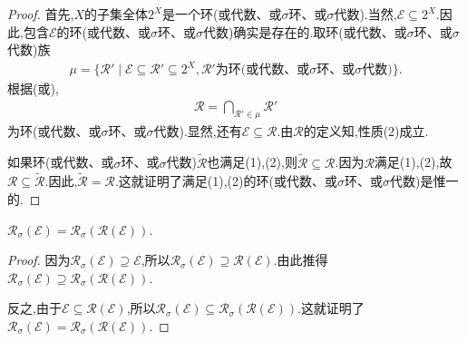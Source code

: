 \documentclass[../../main.tex]{subfiles}%
\begin{document}
\begin{proof}

首先,$X$的子集全体$2^X$是一个环(或代数、或$\sigma$环、或$\sigma$代数).当然,$\mathscr{E} \subseteq 2^X$.因此,包含$\mathscr{E}$的环(或代数、或$\sigma$环、或$\sigma$代数)确实是存在的.取环(或代数、或$\sigma$环、或$\sigma$代数)族
\begin{align*}
\mu = \{\mathscr{R}' \mid \mathscr{E} \subseteq \mathscr{R}' \subseteq 2^X, \mathscr{R}' \text{为环(或代数、或$\sigma$环、或$\sigma$代数)}\}.
\end{align*}
根据(或),
\begin{align*}
\mathscr{R} = \bigcap_{\mathscr{R}' \in \mu} \mathscr{R}'
\end{align*}
为环(或代数、或$\sigma$环、或$\sigma$代数).显然,还有$\mathscr{E} \subseteq \mathscr{R}$.由$\mathscr{R}$的定义知,性质(2)成立.

如果环(或代数、或$\sigma$环、或$\sigma$代数)$\widetilde{\mathscr{R}}$也满足(1),(2),则$\widetilde{\mathscr{R}} \subseteq \mathscr{R}$.因为$\mathscr{R}$满足(1),(2),故$\mathscr{R} \subseteq \widetilde{\mathscr{R}}$.因此,$\widetilde{\mathscr{R}} = \mathscr{R}$.这就证明了满足(1),(2)的环(或代数、或$\sigma$环、或$\sigma$代数)是惟一的.
\end{proof}

\begin{theorem}
$\mathscr{R}_\sigma(\mathscr{E}) = \mathscr{R}_\sigma(\mathscr{R}(\mathscr{E})).$
\end{theorem}
\begin{proof}

因为$\mathscr{R}_\sigma(\mathscr{E}) \supseteq \mathscr{E}$,所以$\mathscr{R}_\sigma(\mathscr{E}) \supseteq \mathscr{R}(\mathscr{E})$.由此推得$\mathscr{R}_\sigma(\mathscr{E}) \supseteq \mathscr{R}_\sigma(\mathscr{R}(\mathscr{E})).$

反之,由于$\mathscr{E} \subseteq \mathscr{R}(\mathscr{E})$,所以$\mathscr{R}_\sigma(\mathscr{E}) \subseteq \mathscr{R}_\sigma(\mathscr{R}(\mathscr{E})).$这就证明了$\mathscr{R}_\sigma(\mathscr{E}) = \mathscr{R}_\sigma(\mathscr{R}(\mathscr{E})).$

\end{proof}
\end{document}
